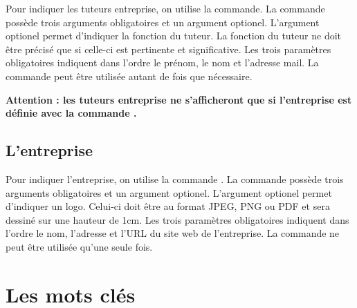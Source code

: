 \documentclass[overfullbox,hideweeklyreports,noseparatecontributorspage,nodate]{polytech}
\begin{document}
Pour indiquer les tuteurs entreprise, on utilise la commande\linebreak \latexcode{\\companysupervisor}. La commande possède trois arguments obligatoires et un argument optionel. L'argument optionel permet d'indiquer la fonction du tuteur. La fonction du tuteur ne doit être précisé que si celle-ci est pertinente et significative. Les trois paramètres obligatoires indiquent dans l'ordre le prénom, le nom et l'adresse mail. La commande  \latexcode{\\companysupervisor} peut être utilisée autant de fois que nécessaire.

\begin{center}
\bf Attention : les tuteurs entreprise ne s'afficheront que si l'entreprise est définie avec la commande \latexcode{\\company}.
\end{center}

\begin{latexsource}
\end{latexsource}

\subsection{L'entreprise}

Pour indiquer l'entreprise, on utilise la commande \latexcode{\\company}. La commande possède trois arguments obligatoires et un argument optionel. L'argument optionel permet d'indiquer un logo. Celui-ci doit être au format JPEG, PNG ou PDF et sera dessiné sur une hauteur de 1cm. Les trois paramètres obligatoires indiquent dans l'ordre le nom, l'adresse et l'URL du site web de l'entreprise. La commande  \latexcode{\\company} ne peut être utilisée qu'une seule fois.

\begin{latexsource}
\end{latexsource}

\section{Les mots clés}
\end{document}
